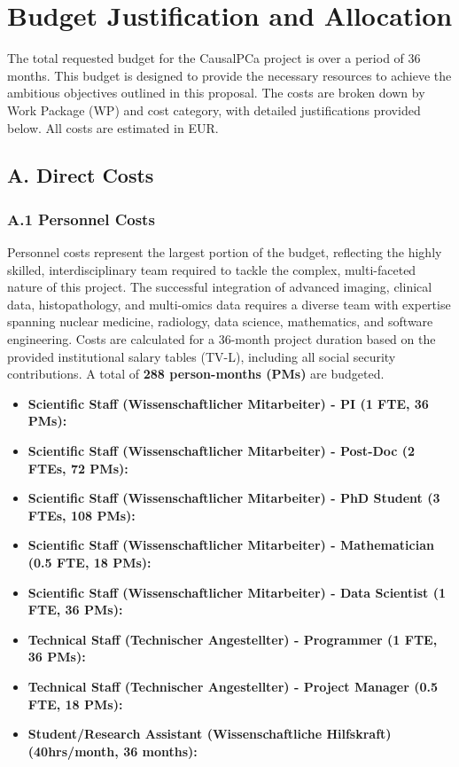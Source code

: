 \section*{Budget Justification and Allocation}

The total requested budget for the CausalPCa project is \textbf{} over a period of 36 months. This budget is designed to provide the necessary resources to achieve the ambitious objectives outlined in this proposal. The costs are broken down by Work Package (WP) and cost category, with detailed justifications provided below. All costs are estimated in EUR.

\subsection*{A. Direct Costs}

\subsubsection*{A.1 Personnel Costs}
Personnel costs represent the largest portion of the budget, reflecting the highly skilled, interdisciplinary team required to tackle the complex, multi-faceted nature of this project. The successful integration of advanced imaging, clinical data, histopathology, and multi-omics data requires a diverse team with expertise spanning nuclear medicine, radiology, data science, mathematics, and software engineering. Costs are calculated for a 36-month project duration based on the provided institutional salary tables (TV-L), including all social security contributions. A total of \textbf{288 person-months (PMs)} are budgeted.

\begin{itemize}
    \item \textbf{Scientific Staff (Wissenschaftlicher Mitarbeiter) - PI (1 FTE, 36 PMs):} 
    \item \textbf{Scientific Staff (Wissenschaftlicher Mitarbeiter) - Post-Doc (2 FTEs, 72 PMs):} 
    \item \textbf{Scientific Staff (Wissenschaftlicher Mitarbeiter) - PhD Student (3 FTEs, 108 PMs):} 
    \item \textbf{Scientific Staff (Wissenschaftlicher Mitarbeiter) - Mathematician (0.5 FTE, 18 PMs):} 
    \item \textbf{Scientific Staff (Wissenschaftlicher Mitarbeiter) - Data Scientist (1 FTE, 36 PMs):} 
    \item \textbf{Technical Staff (Technischer Angestellter) - Programmer (1 FTE, 36 PMs):} 
    \item \textbf{Technical Staff (Technischer Angestellter) - Project Manager (0.5 FTE, 18 PMs):} 
    \item \textbf{Student/Research Assistant (Wissenschaftliche Hilfskraft) (40hrs/month, 36 months):} 
\end{itemize}

